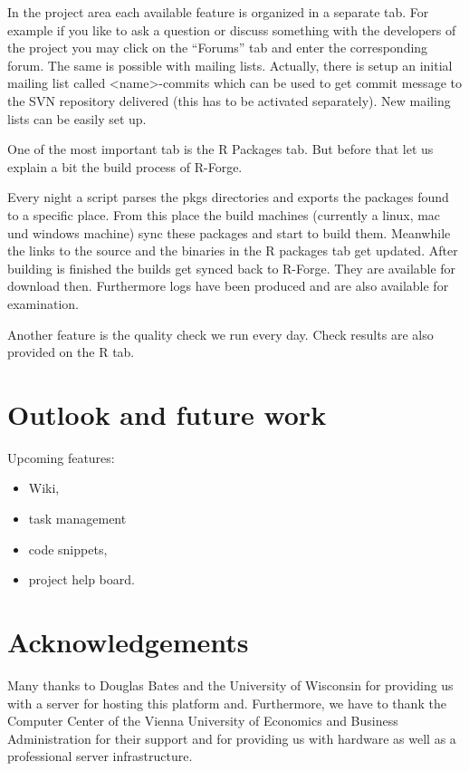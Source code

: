 In the project area each available feature is organized in a separate
tab. For example if you like to ask a question or discuss something
with the developers of the project you may click on the ``Forums'' tab
and enter the corresponding forum. The same is possible with mailing
lists. Actually, there is setup an initial mailing list called
<name>-commits which can be used to get commit message to the SVN
repository delivered (this has to be activated separately). New
mailing lists can be easily set up.

One of the most important tab is the R Packages tab. But before that
let us explain a bit the build process of R-Forge.

Every night a script parses the pkgs directories and exports the
packages found to a specific place. From this place the build machines
(currently a linux, mac und windows machine) sync these packages and
start to build them. Meanwhile the links to the source and the
binaries in the R packages tab get updated. After building is finished
the builds get synced back to R-Forge. They are available for download
then. Furthermore logs have been produced and are also available for
examination.

Another feature is the quality check we run every day. Check results
are also provided on the R tab.


\section*{Outlook and future work}

Upcoming features:
\begin{itemize}
\item Wiki,
\item task management
\item code snippets,
\item project help board.
\end{itemize}


\section{Acknowledgements}

Many thanks to Douglas Bates and the University of Wisconsin
for providing us with a server for hosting this platform
and. Furthermore, we have to thank the Computer Center 
of the Vienna University of Economics and Business Administration for
their support and for providing us with hardware as well as a
professional server infrastructure.


